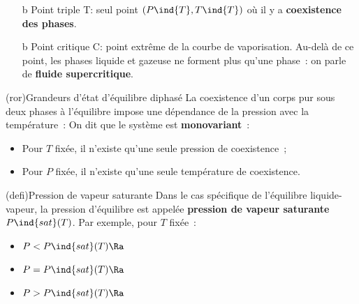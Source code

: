 \documentclass[../../main/main.tex]{subfiles}
\begin{document}
\begin{tcb*}
\begin{isd}
	\end{isd}
	\begin{itemize}
		\item[b]{Point triple T}: seul point $(P\ind{T},T\ind{T})$ où il y
		a \textbf{coexistence des phases}.
		\item[b]{Point critique C}: point extrême de la courbe de vaporisation.
		Au-delà de ce point, les phases liquide et gazeuse ne forment plus qu'une
		phase~: on parle de \textbf{fluide supercritique}.
	\end{itemize}
\end{tcb*}

\begin{tcb*}(ror){Grandeurs d'état d'équilibre diphasé}
	La coexistence d'un corps pur sous deux phases à l'équilibre impose une
	dépendance de la pression avec la température~:
	\psw{%
		\[
			\boxed{P\ind{diphasé} = f (T\ind{diphasé})}
		\]
	}%
	On dit que le système est \textbf{monovariant}~:
	\begin{itemize}
		\item Pour $T$ fixée, il n'existe qu'une seule pression de coexistence~;
		\item Pour $P$ fixée, il n'existe qu'une seule température de coexistence.
	\end{itemize}
\end{tcb*}

\begin{tcb*}(defi){Pression de vapeur saturante}
	Dans le cas spécifique de l'équilibre liquide-vapeur, la pression d'équilibre
	est appelée \textbf{pression de vapeur saturante} $P\ind{sat}(T)$. Par
	exemple, pour $T$ fixée~:
	\begin{itemize}
		\item $P < P\ind{sat}(T) \Ra$
		\item $P = P\ind{sat}(T) \Ra$
		\item $P > P\ind{sat}(T) \Ra$
	\end{itemize}
\end{tcb*}
\end{document}
